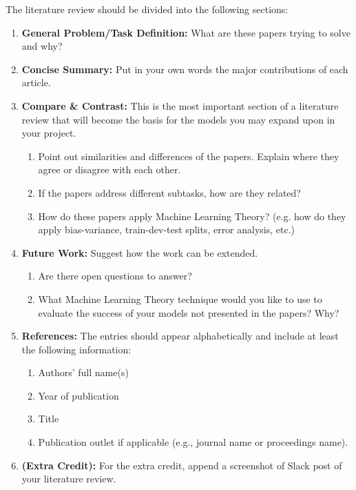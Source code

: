 The literature review should be divided into the following sections:

\begin{enumerate}
    \item \textbf{General Problem/Task Definition:} What are these papers trying to solve and why?
    \item \textbf{Concise Summary:} Put in your own words the major contributions of each article.
    \item \textbf{Compare \& Contrast:} This is the most important section of a literature review that will become the basis for the models you may expand upon in your project.
    \begin{enumerate}
        \item Point out similarities and differences of the papers.  Explain where they agree or disagree with each other.
        \item If the papers address different subtasks, how are they related?
        \item How do these papers apply Machine Learning Theory? (e.g. how do they apply bias-variance, train-dev-test splits, error analysis, etc.)
    \end{enumerate}
    \item \textbf{Future Work:} Suggest how the work can be extended.
    \begin{enumerate}
        \item Are there open questions to answer?
        \item What Machine Learning Theory technique would you like to use to evaluate the success of your models not presented in the papers? Why?
    \end{enumerate}
    \item \textbf{References:} The entries should appear alphabetically and include at least the following information:
    \begin{enumerate}
        \item Authors’ full name(s)
        \item Year of publication
        \item Title
        \item Publication outlet if applicable (e.g., journal name or proceedings name).
    \end{enumerate}
    \item \textbf{(Extra Credit):} For the extra credit, append a screenshot of Slack post of your literature review.
\end{enumerate}

